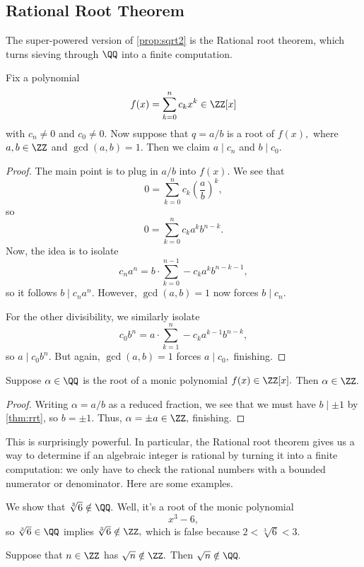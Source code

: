 \subsection{Rational Root Theorem}
The super-powered version of \autoref{prop:sqrt2} is the Rational root theorem, which turns sieving through $\QQ$ into a finite computation.
\begin{thm} \label{thm:rrt}
    Fix a polynomial
    \[f(x)=\sum_{k=0}^nc_kx^k\in\ZZ[x]\]
    with $c_n\ne0$ and $c_0\ne0.$ Now suppose that $q=a/b$ is a root of $f(x),$ where $a,b\in\ZZ$ and $\gcd(a,b)=1.$ Then we claim $a\mid c_n$ and $b\mid c_0.$
\end{thm}
\begin{proof}
    The main point is to plug in $a/b$ into $f(x).$ We see that
    \[0=\sum_{k=0}^nc_k\left(\frac ab\right)^k,\]
    so
    \[0=\sum_{k=0}^nc_ka^kb^{n-k}.\]
    Now, the idea is to isolate
    \[c_na^n=b\cdot\sum_{k=0}^{n-1}-c_ka^kb^{n-k-1},\]
    so it follows $b\mid c_na^n.$ However, $\gcd(a,b)=1$ now forces $\boxed{b\mid c_n}.$
    
    For the other divisibility, we similarly isolate
    \[c_0b^n=a\cdot\sum_{k=1}^n-c_ka^{k-1}b^{n-k},\]
    so $a\mid c_0b^n.$ But again, $\gcd(a,b)=1$ forces $\boxed{a\mid c_0},$ finishing.
\end{proof}
\begin{cor} \label{cor:rrt}
    Suppose $\alpha\in\QQ$ is the root of a monic polynomial $f(x)\in\ZZ[x].$ Then $\alpha\in\ZZ.$
\end{cor}
\begin{proof}
    Writing $\alpha=a/b$ as a reduced fraction, we see that we must have $b\mid\pm1$ by \autoref{thm:rrt}, so $b=\pm1.$ Thus, $\alpha=\pm a\in\ZZ,$ finishing.
\end{proof}
This is surprisingly powerful. In particular, the Rational root theorem gives us a way to determine if an algebraic integer is rational by turning it into a finite computation: we only have to check the rational numbers with a bounded numerator or denominator. Here are some examples.
\begin{ex}
    We show that $\sqrt[3]6\notin\QQ.$ Well, it's a root of the monic polynomial
    \[x^3-6,\]
    so $\sqrt[3]6\in\QQ$ implies $\sqrt[3]6\notin\ZZ,$ which is false because $2<\sqrt[3]6<3.$
\end{ex}
\begin{cor}
    Suppose that $n\in\ZZ$ has $\sqrt n\notin\ZZ.$ Then $\sqrt n\notin\QQ.$
\end{cor}
